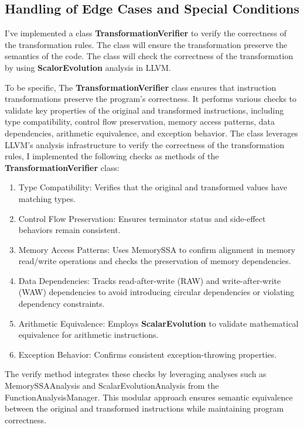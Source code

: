 \documentclass[conference]{IEEEtran}
\begin{document}
\subsection{Handling of Edge Cases and Special Conditions}
I've implemented a class \textbf{TransformationVerifier} to verify the correctness of the transformation rules. The class will ensure the transformation preserve the semantics of the code. The class will check the correctness of the transformation by using \textbf{ScalorEvolution} analysis in LLVM.

To be specific, The \textbf{TransformationVerifier} class ensures that instruction transformations preserve the program's correctness. It performs various checks to validate key properties of the original and transformed instructions, including type compatibility, control flow preservation, memory access patterns, data dependencies, arithmetic equivalence, and exception behavior. The class leverages LLVM's analysis infrastructure to verify the correctness of the transformation rules, I implemented the following checks as methods of the \textbf{TransformationVerifier} class:

\begin{enumerate}
	\item Type Compatibility: Verifies that the original and transformed values have matching types.

	\item Control Flow Preservation: Ensures terminator status and side-effect behaviors remain consistent.

	\item Memory Access Patterns: Uses MemorySSA to confirm alignment in memory read/write operations and checks the preservation of memory dependencies.

	\item Data Dependencies: Tracks read-after-write (RAW) and write-after-write (WAW) dependencies to avoid introducing circular dependencies or violating dependency constraints.

	\item Arithmetic Equivalence: Employs \textbf{ScalarEvolution} to validate mathematical equivalence for arithmetic instructions.

	\item Exception Behavior: Confirms consistent exception-throwing properties.
\end{enumerate}

The verify method integrates these checks by leveraging analyses such as MemorySSAAnalysis and ScalarEvolutionAnalysis from the FunctionAnalysisManager. This modular approach ensures semantic equivalence between the original and transformed instructions while maintaining program correctness.
\end{document}
